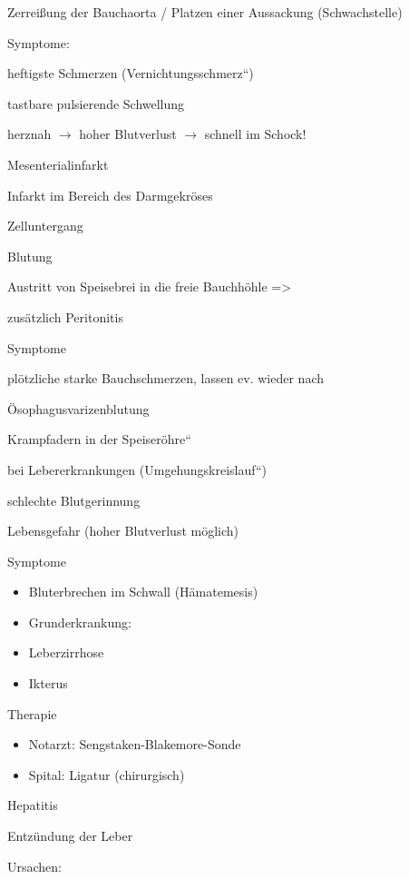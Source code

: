 \documentclass{article}
\begin{document}
Zerrei{\ss}ung der Bauchaorta / Platzen  einer Aussackung
(Schwachstelle)

Symptome:

heftigste Schmerzen
({\quotedblbase}Vernichtungsschmerz{\textquotedblleft})

tastbare pulsierende Schwellung

herznah ${\rightarrow}$ hoher Blutverlust ${\rightarrow}$ schnell im 
Schock! 

Mesenterialinfarkt

Infarkt im Bereich des Darmgekr\"oses

Zelluntergang

Blutung

Austritt von Speisebrei in die freie Bauchh\"ohle  ={\textgreater}

zus\"atzlich Peritonitis

Symptome

pl\"otzliche starke Bauchschmerzen, lassen ev.  wieder nach

\"Osophagusvarizenblutung

{\quotedblbase}Krampfadern in der Speiser\"ohre{\textquotedblleft}

bei Lebererkrankungen 
({\quotedblbase}Umgehungskreislauf{\textquotedblleft})

schlechte Blutgerinnung

Lebensgefahr (hoher Blutverlust  m\"oglich)

Symptome

\begin{itemize}
\item Bluterbrechen im Schwall (H\"amatemesis)

\item Grunderkrankung:

\item Leberzirrhose

\item Ikterus

\end{itemize}
Therapie

\begin{itemize}
\item Notarzt: Sengstaken-Blakemore-Sonde

\item Spital: Ligatur (chirurgisch)

\end{itemize}
Hepatitis

Entz\"undung der Leber

Ursachen:
\end{document}
